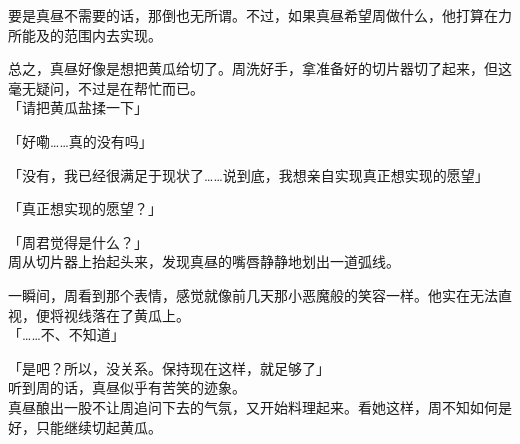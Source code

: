 要是真昼不需要的话，那倒也无所谓。不过，如果真昼希望周做什么，他打算在力所能及的范围内去实现。

总之，真昼好像是想把黄瓜给切了。周洗好手，拿准备好的切片器切了起来，但这毫无疑问，不过是在帮忙而已。\\

「请把黄瓜盐揉一下」

「好嘞……真的没有吗」

「没有，我已经很满足于现状了……说到底，我想亲自实现真正想实现的愿望」

「真正想实现的愿望？」

「周君觉得是什么？」\\

周从切片器上抬起头来，发现真昼的嘴唇静静地划出一道弧线。

一瞬间，周看到那个表情，感觉就像前几天那小恶魔般的笑容一样。他实在无法直视，便将视线落在了黄瓜上。\\

「……不、不知道」

「是吧？所以，没关系。保持现在这样，就足够了」\\

听到周的话，真昼似乎有苦笑的迹象。\\

真昼酿出一股不让周追问下去的气氛，又开始料理起来。看她这样，周不知如何是好，只能继续切起黄瓜。

